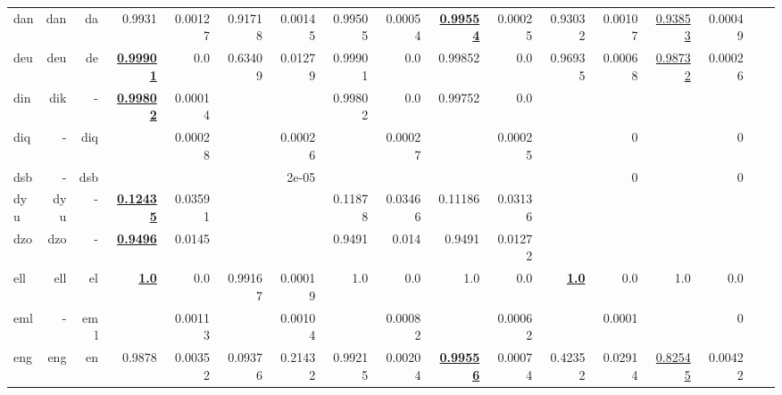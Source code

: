 \documentclass[11pt]{article}
\begin{document}
\begin{table*}[h]
{\begin{tabular}{lrrrrrrrrrrrrrrrr}
dan         & dan         & da         & 0.9931         & 0.00127         & 0.91718         & 0.00145         & 0.99505         & 0.00054         & \textbf{\underline{0.99554}}         & 0.00025         & 0.93032         & 0.00107         & \underline{0.93853}         & 0.00049         \\
deu         & deu         & de         & \textbf{\underline{0.99901}}         & 0.0         & 0.63409         & 0.01279         & 0.99901         & 0.0         & 0.99852         & 0.0         & 0.96935         & 0.00068         & \underline{0.98732}         & 0.00026         \\
din         & dik         & -         & \textbf{\underline{0.99802}}         & 0.00014         &          &          & 0.99802         & 0.0         & 0.99752         & 0.0         &          &          &          &          \\
diq         & -         & diq         &          & 0.00028         &          & 0.00026         &          & 0.00027         &          & 0.00025         &          & 0         &          & 0         \\
dsb         & -         & dsb         &          &          &          & 2e-05         &          &          &          &          &          & 0         &          & 0         \\
dyu         & dyu         & -         & \textbf{\underline{0.12435}}         & 0.03591         &          &          & 0.11878         & 0.03466         & 0.11186         & 0.03136         &          &          &          &          \\
dzo         & dzo         & -         & \textbf{\underline{0.9496}}         & 0.0145         &          &          & 0.9491         & 0.014         & 0.9491         & 0.01272         &          &          &          &          \\
ell         & ell         & el         & \textbf{\underline{1.0}}         & 0.0         & 0.99167         & 0.00019         & 1.0         & 0.0         & 1.0         & 0.0         & \textbf{\underline{1.0}}         & 0.0         & 1.0         & 0.0         \\
eml         & -         & eml         &          & 0.00113         &          & 0.00104         &          & 0.00082         &          & 0.00062         &          & 0.0001         &          & 0         \\
eng         & eng         & en         & 0.9878         & 0.00352         & 0.09376         & 0.21432         & 0.99215         & 0.00204         & \textbf{\underline{0.99556}}         & 0.00074         & 0.42352         & 0.02914         & \underline{0.82545}         & 0.00422         \\

\end{tabular}}
\end{table*}
\end{document}
